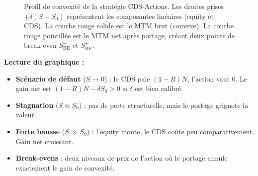 \begin{figure}[htbp]
    \caption{Profil de convexité de la stratégie CDS-Actions. Les droites grises $\pm\delta(S-S_0)$ représentent les composantes linéaires (equity et CDS). La courbe rouge solide est le MTM brut (convexe). La courbe rouge pointillée est le MTM net après portage, créant deux points de break-even $S^-_{\mathrm{BE}}$ et $S^+_{\mathrm{BE}}$.}
    \label{fig:convexite}
\end{figure}

\textbf{Lecture du graphique :}
\begin{itemize}
    \item \textbf{Scénario de défaut} ($S \to 0$) : le CDS paie $(1-R)N$, l'action vaut 0. Le gain net est $(1-R)N - \delta S_0 > 0$ si $\delta$ est bien calibré.
    \item \textbf{Stagnation} ($S \approx S_0$) : pas de perte structurelle, mais le portage grignote la valeur.
    \item \textbf{Forte hausse} ($S \gg S_0$) : l'equity monte, le CDS coûte peu comparativement. Gain net croissant.
    \item \textbf{Break-evens} : deux niveaux de prix de l'action où le portage annule exactement le gain de convexité.
\end{itemize}

